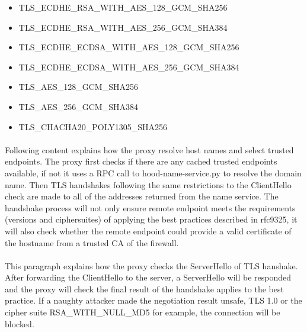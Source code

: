 \documentclass[mscthesis]{usiinfthesis}
\begin{document}
\begin{itemlist}[H]
  \begin{itemize}
    \item TLS\_ECDHE\_RSA\_WITH\_AES\_128\_GCM\_SHA256
    \item TLS\_ECDHE\_RSA\_WITH\_AES\_256\_GCM\_SHA384
    \item TLS\_ECDHE\_ECDSA\_WITH\_AES\_128\_GCM\_SHA256
    \item TLS\_ECDHE\_ECDSA\_WITH\_AES\_256\_GCM\_SHA384
    \item TLS\_AES\_128\_GCM\_SHA256
    \item TLS\_AES\_256\_GCM\_SHA384
    \item TLS\_CHACHA20\_POLY1305\_SHA256
  \end{itemize}
  \label{lst:tls-ciphersuites}
\end{itemlist}

\paragraph{}
Following content explains how the proxy resolve host names and select trusted endpoints. The proxy first checks if there are any cached trusted endpoints available, if not it uses a RPC call to hood-name-service.py to resolve the domain name. Then TLS handshakes following the same restrictions to the ClientHello check are made to all of the addresses returned from the name service. The handshake process will not only ensure remote endpoint meets the requirements (versions and ciphersuites) of applying the best practices described in rfc9325, it will also check whether the remote endpoint could provide a valid certificate of the hostname from a trusted CA of the firewall.
\paragraph{}
This paragraph explains how the proxy checks the ServerHello of TLS hanshake. After forwarding the ClientHello to the server, a ServerHello will be responded and the proxy will check the final result of the handshake applies to the best practice. If a naughty attacker made the negotiation result unsafe, TLS 1.0 or the cipher suite RSA\_WITH\_NULL\_MD5 for example, the connection will be blocked.
\end{document}
